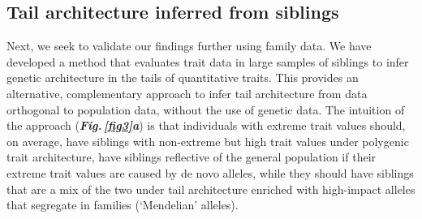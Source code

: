\documentclass[12pt]{zHenriquesLab-StyleBioRxiv}
\newcommand\dref[2]{\normalsize{\textbf{\textit{Fig.\,\ref{#1}#2}}}\normalsize{}}
\begin{document}
\subsection*{Tail architecture inferred from siblings} 
Next, we seek to validate our findings further using family data. 
We have developed a method \cite{Souaiaia2024} that evaluates trait 
data in large samples of siblings to infer genetic architecture 
in the tails of quantitative traits. This provides an 
alternative, complementary approach to infer tail architecture 
from data orthogonal to population data, without the use of 
genetic data. The intuition of the approach (\dref{fig3}{a}) is that 
individuals with extreme trait values should, on average, 
have siblings with non-extreme but high trait values under 
polygenic trait architecture, have siblings reflective of 
the general population if their extreme trait values are caused 
by de novo alleles, while they should have siblings that are a 
mix of the two under tail architecture enriched with high-impact 
alleles that segregate in families (‘Mendelian’ alleles).
\end{document}
